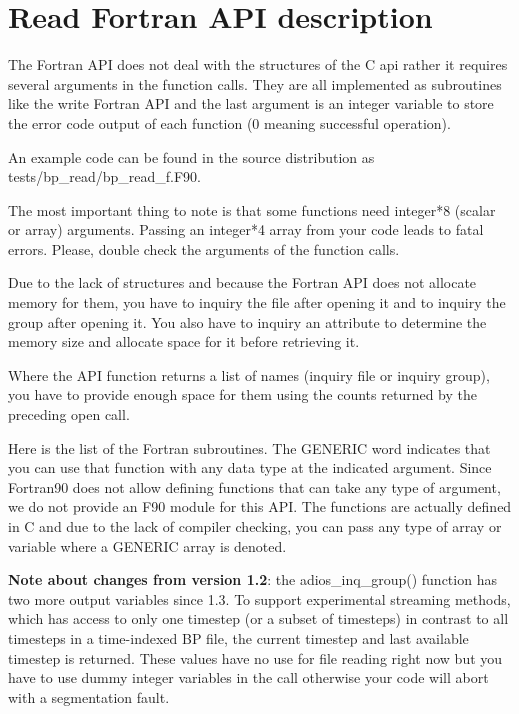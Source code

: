 \section{Read Fortran API description}

The Fortran API does not deal with the structures of the C api rather it requires 
several arguments in the function calls.  They are all implemented as subroutines 
like the write Fortran API and the last argument is an integer variable to store 
the error code output of each function (0 meaning successful operation). 

An example code can be found in the source distribution as tests/bp\_read/bp\_read\_f.F90.

The most important thing to note is that some functions need integer*8 (scalar 
or array) arguments. Passing an integer*4 array from your code leads to fatal errors. 
Please, double check the arguments of the function calls. 

Due to the lack of structures and because the Fortran API does not allocate memory 
for them, you have to inquiry the file after opening it and to inquiry the group 
after opening it. You also have to inquiry an attribute to determine the memory 
size and allocate space for it before retrieving it. 

Where the API function returns a list of names (inquiry file or inquiry group), 
you have to provide enough space for them using the counts returned by the preceding 
open call. 

Here is the list of the Fortran subroutines. The GENERIC word indicates that you 
can use that function with any data type at the indicated argument. Since Fortran90 
does not allow defining functions that can take any type of argument, we do not 
provide an F90 module for this API. The functions are actually defined in C and 
due to the lack of compiler checking, you can pass any type of array or variable 
where a GENERIC array is denoted. 

\textbf{Note about changes from version 1.2}: the adios\_inq\_group() function 
has two more output variables since 1.3. To support experimental streaming methods, 
which has access to only one timestep (or a subset of timesteps) in contrast to 
all timesteps in a time-indexed BP file, the current timestep and last available 
timestep is returned. These values have no use for file reading right now but you 
have to use dummy integer variables in the call otherwise your code will abort 
with a segmentation fault. 

